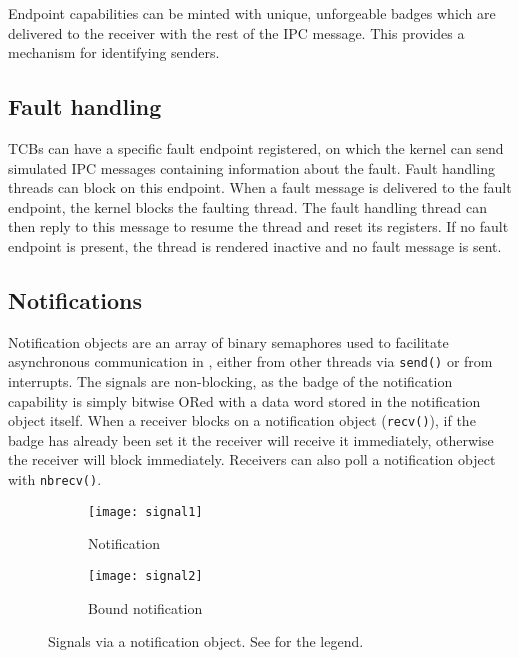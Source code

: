 Endpoint capabilities can be minted with unique, unforgeable badges which are delivered to the
receiver with the rest of the IPC message. This provides a mechanism for identifying senders.

\subsection{Fault handling}

\glspl{TCB} can have a specific fault endpoint registered, on which the kernel can send simulated
\gls{IPC} messages containing information about the fault. Fault handling threads can block on this 
endpoint. When a fault message is delivered to the fault endpoint, the kernel blocks the faulting
thread. The fault handling thread can then reply to this message to resume the thread and reset its
registers. If no fault endpoint is present, the
thread is rendered inactive and no fault message is sent. 

\subsection{Notifications}

Notification objects are an array of binary semaphores used to facilitate asynchronous communication in \selfour, either from other threads via \texttt{send()} or from
interrupts.  The signals are non-blocking, as the badge of the notification capability is simply
bitwise ORed with a data word stored in the notification object itself. When a receiver blocks on a
notification object (\texttt{recv()}), if the badge has already been set it the receiver will
receive it immediately, otherwise the receiver will block immediately. Receivers can also poll a
notification object with \texttt{nbrecv()}.

\begin{figure}
    \centering
    \begin{subfigure}[h]{0.48\textwidth}
        \centering
        \texttt{[image: signal1]}
        \caption{Notification}
        \label{f:signal1}
    \end{subfigure}%
    \begin{subfigure}[h]{0.48\textwidth}
        \centering
        \texttt{[image: signal2]}
        \caption{Bound notification}
        \label{f:signal2}
    \end{subfigure}
    \label{f:signal}
    \caption{Signals via a notification object. See  for the legend.}
\end{figure}


